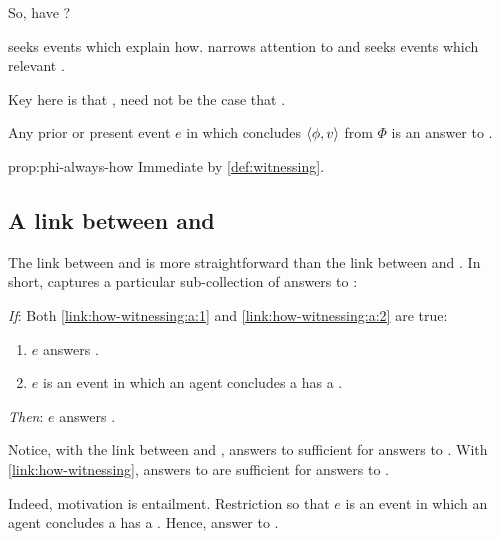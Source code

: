 \begin{note}
  So, have \wit{}?

  \qHow{} seeks events which explain how.
  \qHowV{} narrows attention to \ros{} and seeks events which \wit{} relevant .

  Key here is that \supportII{}, need not be the case that \wit{}.
\end{note}

\begin{note}
  \begin{proposition}%
    \label{prop:phi-always-how}%
    Any prior or present event \(e\) in which \vAgent{} concludes \(\langle \phi, v \rangle\) from \(\Phi\) is an answer to \qHowV{}.
  \end{proposition}

  \begin{argument}{prop:phi-always-how}
    Immediate by \autoref{def:witnessing}.
  \end{argument}
\end{note}

\subsection{A link between \qHow{} and \qHowV{}}
\label{cha:var:qhowv:sec:link}

\begin{note}
  The link between \qHowV{} and \qHow{} is more straightforward than the link between \qWhyV{} and \qWhy{}.
  In short, \qHowV{} captures a particular sub-collection of answers to \qHow{}:

  \begin{link}%
    \label{link:how-witnessing}%
    \vspace{-\baselineskip}
      \begin{itenum}
      \item[\emph{If}:]
        Both \ref{link:how-witnessing:a:1} and \ref{link:how-witnessing:a:2} are true:
        \begin{enumerate}[label=\alph*., ref=(\alph*)]
        \item
          \label{link:how-witnessing:a:1}
        \(e\) answers \qHow{}.
      \item
        \label{link:how-witnessing:a:2}
        \(e\) is an event in which an agent concludes a \prop{} has a \val{}.
        \end{enumerate}
      \item[\emph{Then}:]
        \(e\) answers \qHowV{}.
      \end{itenum}
    \vspace{-\baselineskip}
  \end{link}

  Notice, with the link between \qWhyV{} and \qWhy{}, answers to \qWhyV{} sufficient for answers to \qWhy{}.
  With \autoref{link:how-witnessing}, answers to \qHow{} are sufficient for answers to \qHowV{}.

  Indeed, motivation is entailment.
  Restriction so that \(e\) is an event in which an agent concludes a \prop{} has a \val{}.
  Hence, answer to \qHowV{}.
\end{note}

